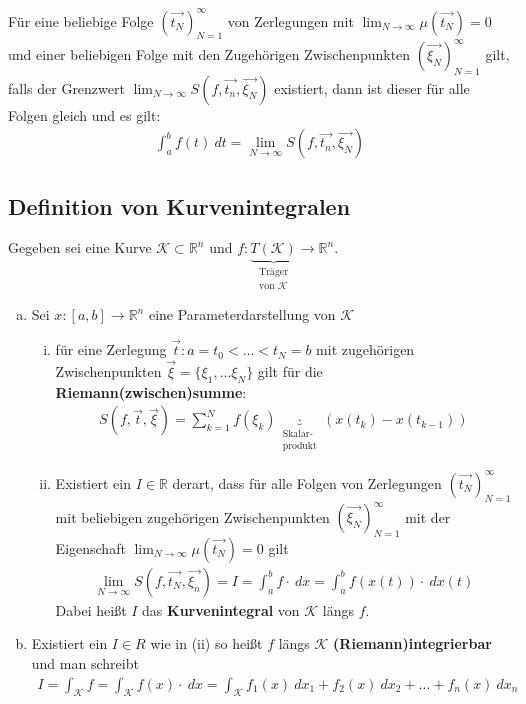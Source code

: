 \documentclass[11pt,a4paper]{book}
\newcommand {\R}	{\mathbb{R}}
\newcommand {\Rn}	{\mathbb{R}^n}
\newcommand{\1}    	{\mathbbm{1}}
\newcommand{\Kurve}	{{\mathcal{K}}}
\begin{document}
\noindent
Für eine beliebige Folge \( \left( \vec{t_N} \right)_{N=1}^\infty \) von Zerlegungen mit \(\lim_{N\rightarrow\infty} \mu\left( \vec{t_N} \right) = 0\) und einer beliebigen Folge mit den Zugehörigen Zwischenpunkten \( \left( \vec{\xi_N} \right)_{N=1}^\infty \) gilt, falls der Grenzwert \( \lim_{N\rightarrow\infty} S\left( f, \vec{t_n}, \vec{\xi_N} \right)\) existiert, dann ist dieser für alle Folgen gleich und es gilt:
\begin{align*}
	\int_a^b f(t) ~dt = \lim_{N\rightarrow\infty} S\left( f, \vec{t_n}, \vec{\xi_N} \right)
\end{align*}

\subsection{Definition von Kurvenintegralen}
Gegeben sei eine Kurve \(\Kurve \subset \Rn\) und \(f : \underbrace{T(\Kurve)}_{\substack{\textrm{Träger}\\\textrm{von }\Kurve}} \rightarrow \Rn\).
\begin{enumerate}[a.~]
	\item Sei \(x: [a,b] \rightarrow \Rn\) eine Parameterdarstellung von \(\Kurve\)
	\begin{enumerate}[(i)]
		\item für eine Zerlegung \(\vec{t} : a = t_0 < ... < t_N = b\) mit zugehörigen Zwischenpunkten \(\vec{\xi} = \{ \xi_1, ... \xi_N \} \) gilt für die \textbf{Riemann(zwischen)summe}:
		\begin{align*}
			S\left( f, \vec{t}, \vec{\xi} \right) = \sum_{k=1}^N f(\xi_k) \underbrace{\cdot}_{\substack{\textrm{Skalar-}\\\textrm{produkt}}} \left(x(t_k) - x(t_{k-1})\right)
		\end{align*}
		\item Existiert ein \(I \in \R\) derart, dass für alle Folgen von Zerlegungen \(\left( \vec{t_N} \right)_{N=1}^\infty \) mit beliebigen zugehörigen Zwischenpunkten \(\left( \vec{\xi_N} \right)_{N=1}^\infty \) mit der Eigenschaft \(\lim_{N\rightarrow\infty} \mu( \vec{t_N} ) = 0\) gilt
		\begin{align*}
			\lim_{N\rightarrow\infty} S\left( f, \vec{t_N}, \vec{\xi_n} \right) = I = \int_a^b f \cdot ~dx = \int_a^b f\left( x(t) \right) \cdot ~dx(t)
		\end{align*}
		Dabei heißt \(I\) das \textbf{Kurvenintegral} von \(\Kurve\) längs \(f\).
	\end{enumerate}
	\item Existiert ein \(I \in R\) wie in (ii) so heißt \(f\) längs \(\Kurve\) \textbf{(Riemann)integrierbar} und man schreibt
	\begin{align*}
		I = \int_\Kurve f = \int_\Kurve f(x) \cdot ~dx = \int_\Kurve f_1(x) ~dx_1 + f_2(x) ~dx_2 + ... + f_n(x) ~dx_n
	\end{align*}
\end{enumerate}
\end{document}
